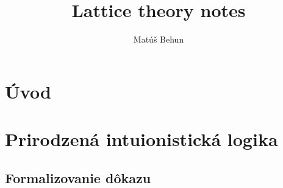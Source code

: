 \documentclass[a4paper,10pt,oneside]{report}%
\author{Mat\'u\v{s} Behun}
\title{Lattice theory notes}
\begin{document}
\tableofcontents

\section{Úvod}






\section{Prirodzená intuionistická logika}

\subsection{Formalizovanie dôkazu}
\end{document}
